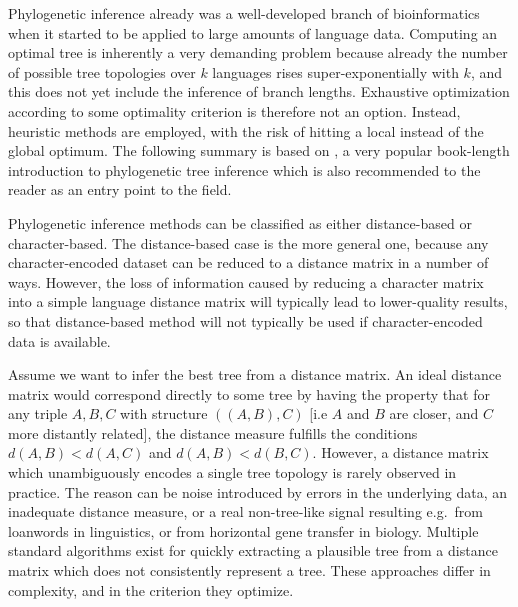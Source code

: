 Phylogenetic inference already was a well-developed branch of bioinformatics when it started to be applied to large amounts of language data. Computing an optimal tree is inherently a very demanding problem because already the number of possible tree topologies over $k$ languages rises super-exponentially with $k$, and this does not yet include the inference of branch lengths. Exhaustive optimization according to some optimality criterion is therefore not an option. Instead, heuristic methods are employed, with the risk of hitting a local instead of the global optimum. The following summary is based on \citet{felsenstein2004}, a very popular book-length introduction to phylogenetic tree inference which is also recommended to the reader as an entry point to the field.

Phylogenetic inference methods can be classified as either distance-based or character-based. The distance-based case is the more general one, because any character-encoded dataset can be reduced to a distance matrix in a number of ways. However, the loss of information caused by reducing a character matrix into a simple language distance matrix will typically lead to lower-quality results, so that distance-based method will not typically be used if character-encoded data is available.

Assume we want to infer the best tree from a distance matrix. An ideal distance matrix would correspond directly to some tree by having the property that for any triple $A,B,C$ with structure $((A,B),C)$ [i.e $A$ and $B$ are closer, and $C$ more distantly related], the distance measure fulfills the conditions $d(A,B) < d(A,C)$ and $d(A,B) < d(B,C)$. However, a distance matrix which unambiguously encodes a single tree topology is rarely observed in practice. The reason can be noise introduced by errors in the underlying data, an inadequate distance measure, or a real non-tree-like signal resulting e.g.\ from loanwords in linguistics, or from horizontal gene transfer in biology. Multiple standard algorithms exist for quickly extracting a plausible tree from a distance matrix which does not consistently represent a tree. These approaches differ in complexity, and in the criterion they optimize.

